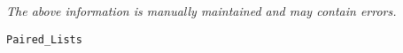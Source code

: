 \label{pkg:paired\_lists}

{\tiny \it The above information is manually maintained and may contain errors.}
\begin{verbatim}
Paired_Lists
\end{verbatim}
